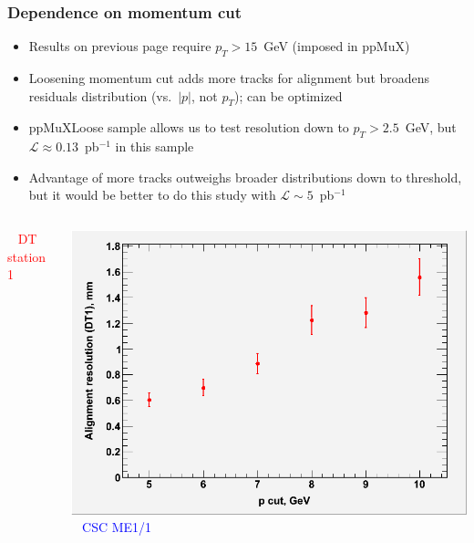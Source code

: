 \documentclass[compress]{beamer}
\begin{document}
\begin{frame}
\frametitle{Dependence on momentum cut}

\begin{itemize}
\item Results on previous page require $p_T > 15$~GeV (imposed in ppMuX)

\item Loosening momentum cut adds more tracks for alignment but
  broadens residuals distribution (vs.\ $|p|$, not $p_T$); can be
  optimized

\item ppMuXLoose sample allows us to test resolution down to $p_T >
  2.5$~GeV, but $\mathcal{L} \approx 0.13$~pb$^{-1}$ in this sample

\item Advantage of more tracks outweighs broader distributions down to
  threshold, but it would be better to do this study with $\mathcal{L}
  \sim 5$~pb$^{-1}$
\end{itemize}

\begin{columns}
\mbox{ } \hfill \textcolor{red}{DT station 1} \hfill \mbox{ }

\includegraphics[width=\linewidth]{momentum_cut_study_dt.png}
\mbox{ } \hfill \textcolor{blue}{CSC ME1/1} \hfill \mbox{ }


\end{columns}
\end{frame}
\end{document}
